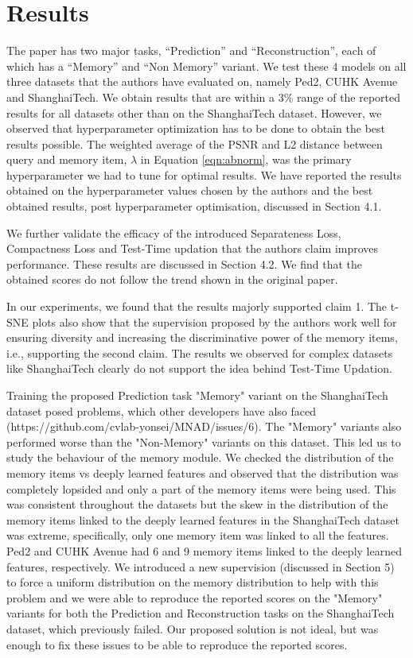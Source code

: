 \section{Results}
The paper has two major tasks, “Prediction”  and “Reconstruction”, each of which has a “Memory” and “Non Memory” variant. We test these 4 models on all three datasets that the authors have evaluated on, namely Ped2\cite{6739466}, CUHK Avenue \cite{6751449} and ShanghaiTech\cite{Luo2017ARO}. We obtain results that are within a 3\% range of the reported results for all datasets other than on the ShanghaiTech dataset\cite{Luo2017ARO}. However, we observed that hyperparameter optimization has to be done to obtain the best results possible. The weighted average of the PSNR and L2 distance between query and memory item, $\lambda$ in Equation \ref{eqn:abnorm}, was the primary hyperparameter we had to tune for optimal results. We have reported the results obtained on the hyperparameter values chosen by the authors and the best obtained results, post hyperparameter optimisation, discussed in Section 4.1. 

We further validate the efficacy of the introduced Separateness Loss, Compactness Loss and Test-Time updation that the authors claim improves performance. These results are discussed in Section 4.2. We find that the obtained scores do not follow the trend shown in the original paper.

In our experiments, we found that the results majorly supported claim 1. The t-SNE plots also show that the supervision proposed by the authors work well for ensuring diversity and increasing the discriminative power of the memory items, i.e., supporting the second claim. The results we observed for complex datasets like ShanghaiTech\cite{Luo2017ARO} clearly do not support the idea behind Test-Time Updation.

 Training the proposed Prediction task "Memory" variant on the ShanghaiTech dataset\cite{Luo2017ARO} posed problems, which other developers have also faced 
 \newline (https://github.com/cvlab-yonsei/MNAD/issues/6). The "Memory" variants also performed worse than the "Non-Memory" variants on this dataset. This led us to study the behaviour of the memory module. We checked the distribution of the memory items vs deeply learned features and observed that the distribution was completely lopsided and only a part of the memory items were being used. This was consistent throughout the datasets but the skew in the distribution of the memory items linked to the deeply learned features in the ShanghaiTech dataset\cite{Luo2017ARO} was extreme, specifically, only one memory item was linked to all the features. Ped2\cite{6739466} and CUHK Avenue\cite{6751449} had 6 and 9 memory items linked to the deeply learned features, respectively. We introduced a new supervision (discussed in Section 5) to force a uniform distribution on the memory distribution to help with this problem and we were able to reproduce the reported scores on the "Memory" variants for both the Prediction and Reconstruction tasks on the ShanghaiTech dataset\cite{Luo2017ARO}, which previously failed. Our proposed solution is not ideal, but was enough to fix these issues to be able to reproduce the reported scores. 

